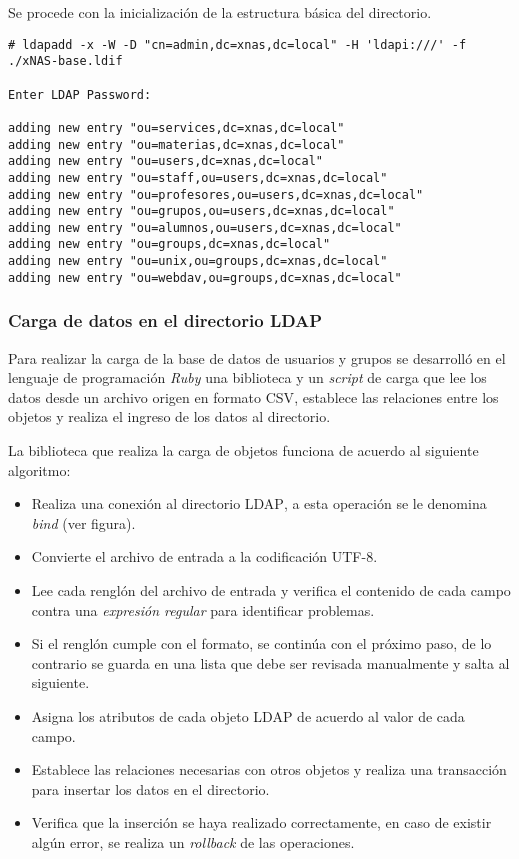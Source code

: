 Se procede con la inicializaci\'{o}n de la estructura b\'{a}sica del directorio.

{
\scriptsize
\linespread{1}
\begin{verbatim}
# ldapadd -x -W -D "cn=admin,dc=xnas,dc=local" -H 'ldapi:///' -f ./xNAS-base.ldif

Enter LDAP Password: 

adding new entry "ou=services,dc=xnas,dc=local"
adding new entry "ou=materias,dc=xnas,dc=local"
adding new entry "ou=users,dc=xnas,dc=local"
adding new entry "ou=staff,ou=users,dc=xnas,dc=local"
adding new entry "ou=profesores,ou=users,dc=xnas,dc=local"
adding new entry "ou=grupos,ou=users,dc=xnas,dc=local"
adding new entry "ou=alumnos,ou=users,dc=xnas,dc=local"
adding new entry "ou=groups,dc=xnas,dc=local"
adding new entry "ou=unix,ou=groups,dc=xnas,dc=local"
adding new entry "ou=webdav,ou=groups,dc=xnas,dc=local"
\end{verbatim}
}

\newpage
          \subsubsection {Carga de datos en el directorio \textsc{LDAP}}

Para realizar la carga de la base de datos de usuarios y grupos se desarroll\'{o} en el lenguaje de programaci\'{o}n \emph{\gls{Ruby}} una biblioteca y un \emph{\gls{script}} de carga que lee los datos desde un archivo origen en formato \textsc{CSV}, establece las relaciones entre los objetos y realiza el ingreso de los datos al directorio.

La biblioteca que realiza la carga de objetos funciona de acuerdo al siguiente algoritmo:

\begin{itemize}
  \item Realiza una conexi\'{o}n al directorio \textsc{\gls{LDAP}}, a esta operaci\'{o}n se le denomina \textit{bind} (ver figura).
  \item Convierte el archivo de entrada a la codificaci\'{o}n \textsc{UTF-8}.
  \item Lee cada rengl\'{o}n del archivo de entrada y verifica el contenido de cada campo contra una \textit{expresi\'{o}n regular} para identificar problemas.
  \item Si el rengl\'{o}n cumple con el formato, se contin\'{u}a con el pr\'{o}ximo paso, de lo contrario se guarda en una lista que debe ser revisada manualmente y salta al siguiente.
  \item Asigna los atributos de cada objeto \textsc{\gls{LDAP}} de acuerdo al valor de cada campo.
  \item Establece las relaciones necesarias con otros objetos y realiza una transacci\'{o}n para insertar los datos en el directorio.
  \item Verifica que la inserci\'{o}n se haya realizado correctamente, en caso de existir alg\'{u}n error, se realiza un \emph{\gls{rollback}} de las operaciones.
\end{itemize}

